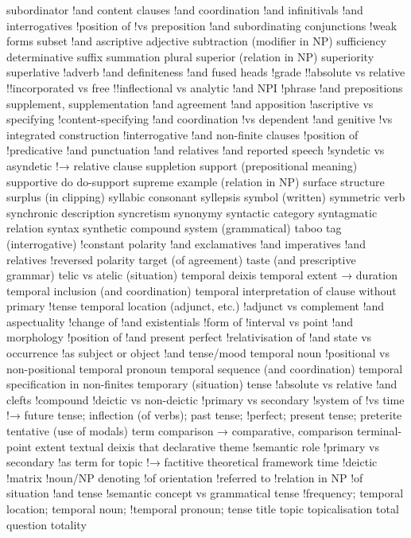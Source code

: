 subordinator
!and content clauses
!and coordination
!and infinitivals
!and interrogatives
!position of
!vs preposition
!and subordinating conjunctions
!weak forms
subset
!and ascriptive adjective
subtraction (modifier in NP)
sufficiency determinative
suffix
summation plural
superior (relation in NP)
superiority
superlative
!adverb
!and definiteness
!and fused heads
!grade
!!absolute vs relative
!!incorporated vs free
!!inflectional vs analytic
!and NPI
!phrase
!and prepositions
supplement, supplementation
!and agreement
!and apposition
!ascriptive vs specifying
!content-specifying
!and coordination
!vs dependent
!and genitive
!vs integrated construction
!interrogative
!and non-finite clauses
!position of
!predicative
!and punctuation
!and relatives
!and reported speech
!syndetic vs asyndetic
!→ relative clause
suppletion
support (prepositional meaning)
supportive do do-support
supreme example (relation in NP)
surface structure
surplus (in clipping)
syllabic consonant
syllepsis
symbol (written)
symmetric verb
synchronic description
syncretism
synonymy
syntactic category
syntagmatic relation
syntax
synthetic compound
system (grammatical)
taboo
tag (interrogative)
!constant polarity
!and exclamatives
!and imperatives
!and relatives
!reversed polarity
target (of agreement)
taste (and prescriptive grammar)
telic vs atelic (situation)
temporal deixis
temporal extent → duration
temporal inclusion (and coordination)
temporal interpretation of clause without primary
!tense
temporal location (adjunct, etc.)
!adjunct vs complement
!and aspectuality
!change of
!and existentials
!form of
!interval vs point
!and morphology
!position of
!and present perfect
!relativisation of
!and state vs occurrence
!as subject or object
!and tense/mood
temporal noun
!positional vs non-positional
temporal pronoun
temporal sequence (and coordination)
temporal specification in non-finites
temporary (situation)
tense
!absolute vs relative
!and clefts
!compound
!deictic vs non-deictic
!primary vs secondary
!system of
!vs time
!→ future tense; inflection (of verbs); past tense;
!perfect; present tense; preterite
tentative (use of modals)
term comparison → comparative, comparison
terminal-point extent
textual deixis
that declarative
theme
!semantic role
!primary vs secondary
!as term for topic
!→ factitive
theoretical framework
time
!deictic
!matrix
!noun/NP denoting
!of orientation
!referred to
!relation in NP
!of situation
!and tense
!semantic concept vs grammatical tense
!frequency; temporal location; temporal noun;
!temporal pronoun; tense
title
topic
topicalisation
total question
totality
